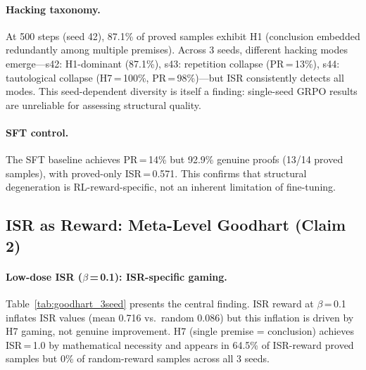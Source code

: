 \documentclass[11pt,a4paper]{article}
\begin{document}
\paragraph{Hacking taxonomy.}
At 500 steps (seed 42), 87.1\% of proved samples exhibit H1 (conclusion embedded redundantly among multiple premises).
Across 3 seeds, different hacking modes emerge---s42: H1-dominant (87.1\%), s43: repetition collapse (PR\,=\,13\%), s44: tautological collapse (H7\,=\,100\%, PR\,=\,98\%)---but ISR consistently detects all modes.
This seed-dependent diversity is itself a finding: single-seed GRPO results are unreliable for assessing structural quality.

\paragraph{SFT control.}
The SFT baseline achieves PR\,=\,14\% but 92.9\% genuine proofs (13/14 proved samples), with proved-only ISR\,=\,0.571.
This confirms that structural degeneration is RL-reward-specific, not an inherent limitation of fine-tuning.

\subsection{ISR as Reward: Meta-Level Goodhart (Claim 2)}
\label{sec:claim2}

\paragraph{Low-dose ISR ($\beta$\,=\,0.1): ISR-specific gaming.}
Table~\ref{tab:goodhart_3seed} presents the central finding.
ISR reward at $\beta$\,=\,0.1 inflates ISR values (mean 0.716 vs.\ random 0.086) but this inflation is driven by H7 gaming, not genuine improvement.
H7 (single premise = conclusion) achieves ISR\,=\,1.0 by mathematical necessity and appears in 64.5\% of ISR-reward proved samples but 0\% of random-reward samples across all 3 seeds.
\end{document}
